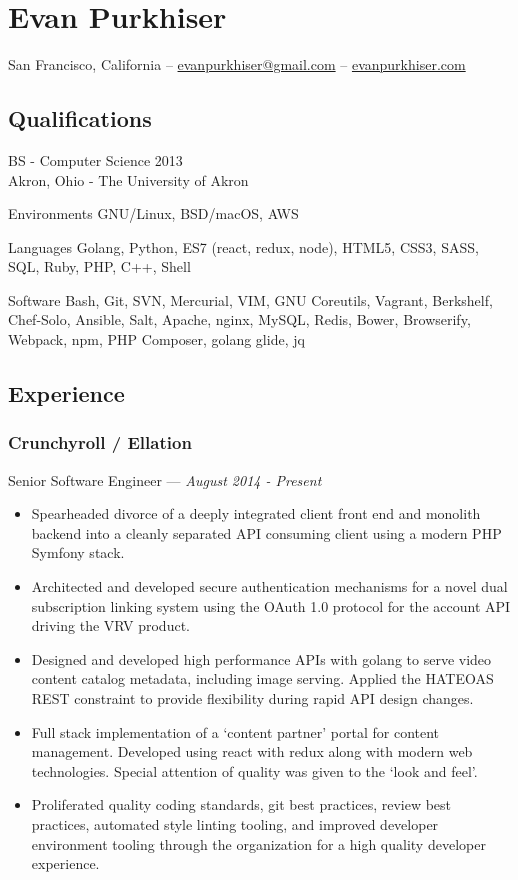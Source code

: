 \documentclass[letterpaper,10pt]{article}
\providecommand{\tightlist}
  {\setlength{\itemsep}{4pt}\setlength{\parskip}{0pt}}
\begin{document}
\section{Evan Purkhiser}

\hfill San Francisco, California --
\href{mailto:evanpurkhiser@gmail.com}{evanpurkhiser@gmail.com} --
\href{http://evanpurkhiser.com}{evanpurkhiser.com}

\subsection{Qualifications}

BS - Computer Science 2013\\
Akron, Ohio - The University of Akron

\begin{skills}
\item[Environments]
  GNU/Linux, BSD/macOS, AWS
\item[Languages]
  Golang, Python, ES7 (react, redux, node), HTML5, CSS3, SASS, SQL,
  Ruby, PHP, C++, Shell
\item[Software]
  Bash, Git, SVN, Mercurial, VIM, GNU Coreutils, Vagrant, Berkshelf,
  Chef-Solo, Ansible, Salt, Apache, nginx, MySQL, Redis, Bower, Browserify,
  Webpack, npm, PHP Composer, golang glide, jq
\end{skills}

\subsection{Experience}

\subsubsection{Crunchyroll / Ellation}
\hfill Senior Software Engineer --- \emph{August 2014 - Present}

\begin{itemize}
\tightlist
\item
  Spearheaded divorce of a deeply integrated client front end and
  monolith backend into a cleanly separated API consuming client using a
  modern PHP Symfony stack.
\item
  Architected and developed secure authentication mechanisms for a novel
  dual subscription linking system using the OAuth 1.0 protocol for the
  account API driving the VRV product.
\item
  Designed and developed high performance APIs with golang to serve
  video content catalog metadata, including image serving. Applied the
  HATEOAS REST constraint to provide flexibility during rapid API design
  changes.
\item
  Full stack implementation of a `content partner' portal for content
  management. Developed using react with redux along with modern web
  technologies. Special attention of quality was given to the `look and
  feel'.
\item
  Proliferated quality coding standards, git best practices, review best
  practices, automated style linting tooling, and improved developer
  environment tooling through the organization for a high quality
  developer experience.
\end{itemize}
\end{document}
